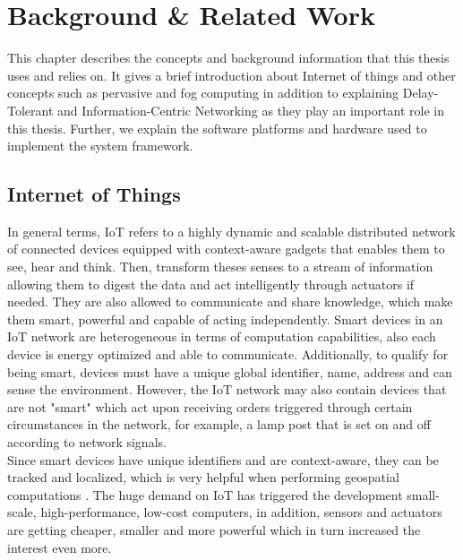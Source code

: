 
\chapter{Background \& Related Work}\label{chapter:background}

This chapter describes the concepts and background information that this thesis uses and relies on. It gives a brief introduction about Internet of things and other concepts such as pervasive and fog computing in addition to  explaining Delay-Tolerant and Information-Centric Networking as they play an important role in this thesis. Further, we explain the software platforms and hardware used to implement the system framework.

\section{Internet of Things}

In general terms, IoT refers to a highly dynamic and scalable distributed network of connected devices equipped with context-aware gadgets that enables them to see, hear and think\cite{DAC:DAC2417}. Then, transform theses senses to a stream of information allowing them to digest the data and act intelligently through actuators if needed. They are also allowed to communicate and share knowledge, which make them smart, powerful and capable of acting independently. Smart devices in an IoT network are heterogeneous in terms of computation capabilities, also each device is energy optimized and able to communicate. Additionally, to qualify for being smart, devices must have a unique global identifier, name, address and can sense the environment. However, the IoT network may also contain devices that are not "smart" which act upon receiving orders triggered through certain circumstances in the network, for example, a lamp post that is set on and off according to network signals. \\

\noindent Since smart devices have unique identifiers and are context-aware, they can be tracked and localized, which is very helpful when performing geospatial computations \cite{Miorandi20121497}. The huge demand on IoT has triggered the development small-scale, high-performance, low-cost computers, in addition, sensors and actuators are getting cheaper, smaller and more powerful which in turn increased the interest even more.\\
 

